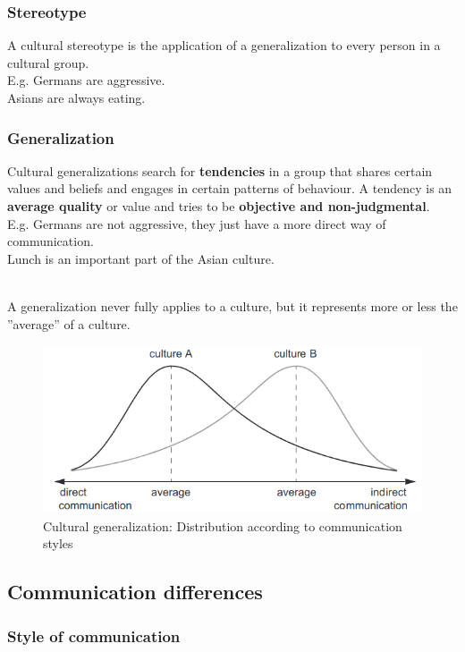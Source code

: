 \subsubsection{Stereotype}
A cultural stereotype is the application of a generalization to every person in a cultural group.\\
E.g. Germans are aggressive.\\
Asians are always eating.

\subsubsection{Generalization}
Cultural generalizations search for \textbf{tendencies} in a group that shares certain values and beliefs and engages in certain patterns of behaviour. A tendency is an \textbf{average quality} or value and tries to be \textbf{objective and non-judgmental}.\\
E.g. Germans are not aggressive, they just have a more direct way of communication.\\
Lunch is an important part of the Asian culture.

\mbox{}\\
A generalization never fully applies to a culture, but it represents more or less the ''average'' of a culture.
\begin{figure}[H]
	\centering
	\includegraphics[width=.8\textwidth]{figures/culturalDistribution.png}
	\caption{Cultural generalization: Distribution according to communication styles}
\end{figure}

\subsection{Communication differences}

\subsubsection{Style of communication}

